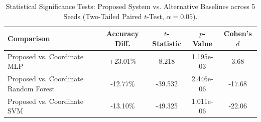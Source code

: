 \begin{table}[t]
\centering
\caption{Statistical Significance Tests: Proposed System vs. Alternative Baselines across 5 Seeds (Two-Tailed Paired $t$-Test, $\alpha = 0.05$).}
\label{tab:significance}
\begin{tabular}{lcccc}
\toprule
\textbf{Comparison} & \textbf{Accuracy Diff.} & \textbf{$t$-Statistic} & \textbf{$p$-Value} & \textbf{Cohen's $d$} \\
\midrule
Proposed vs. Coordinate MLP & +23.01\% & 8.218 & 1.195e-03 & 3.68 \\
Proposed vs. Coordinate Random Forest & -12.77\% & -39.532 & 2.446e-06 & -17.68 \\
Proposed vs. Coordinate SVM & -13.10\% & -49.325 & 1.011e-06 & -22.06 \\
\bottomrule
\end{tabular}
\end{table}
